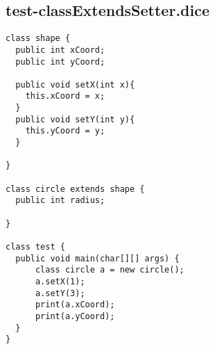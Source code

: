 \subsection{test-classExtendsSetter.dice}
\begin{verbatim}
class shape {
  public int xCoord;
  public int yCoord;

  public void setX(int x){
  	this.xCoord = x;
  }
  public void setY(int y){
   	this.yCoord = y;
  }

}

class circle extends shape {
  public int radius;

}

class test {
  public void main(char[][] args) {
      class circle a = new circle(); 
      a.setX(1);
      a.setY(3);
      print(a.xCoord);
      print(a.yCoord);
  }
}
\end{verbatim}